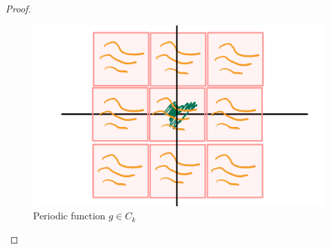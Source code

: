 \begin{proof}[Proof]
\begin{figure}[h]
\begin{center}
					\includegraphics[scale=0.07]{periodic.jpeg}
				\end{center}
				\vspace{-3mm}
				\caption*{Periodic function $g\in C_k$}
				\end{figure}			


\end{proof}
